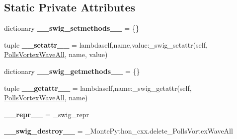 \subsection*{Static Private Attributes}
\begin{DoxyCompactItemize}
\item 
\hypertarget{classMontePython__cxx_1_1PollsVortexWaveAll_ad16d6df402fd173393577d4ea56b5842}{}dictionary {\bfseries \+\_\+\+\_\+swig\+\_\+setmethods\+\_\+\+\_\+} = \{\}\label{classMontePython__cxx_1_1PollsVortexWaveAll_ad16d6df402fd173393577d4ea56b5842}

\item 
\hypertarget{classMontePython__cxx_1_1PollsVortexWaveAll_ae5198d88ff56bd3fb30e0570d44aa002}{}tuple {\bfseries \+\_\+\+\_\+setattr\+\_\+\+\_\+} = lambdaself,name,value\+:\+\_\+swig\+\_\+setattr(self, \hyperlink{classMontePython__cxx_1_1PollsVortexWaveAll}{Polls\+Vortex\+Wave\+All}, name, value)\label{classMontePython__cxx_1_1PollsVortexWaveAll_ae5198d88ff56bd3fb30e0570d44aa002}

\item 
\hypertarget{classMontePython__cxx_1_1PollsVortexWaveAll_a1650e3e3764d597b9dd0f299d5fbc6c9}{}dictionary {\bfseries \+\_\+\+\_\+swig\+\_\+getmethods\+\_\+\+\_\+} = \{\}\label{classMontePython__cxx_1_1PollsVortexWaveAll_a1650e3e3764d597b9dd0f299d5fbc6c9}

\item 
\hypertarget{classMontePython__cxx_1_1PollsVortexWaveAll_a04a545796e9569b8cc2e822381d63322}{}tuple {\bfseries \+\_\+\+\_\+getattr\+\_\+\+\_\+} = lambdaself,name\+:\+\_\+swig\+\_\+getattr(self, \hyperlink{classMontePython__cxx_1_1PollsVortexWaveAll}{Polls\+Vortex\+Wave\+All}, name)\label{classMontePython__cxx_1_1PollsVortexWaveAll_a04a545796e9569b8cc2e822381d63322}

\item 
\hypertarget{classMontePython__cxx_1_1PollsVortexWaveAll_a829b48677d9d282d9b5883c5f1a8d08d}{}{\bfseries \+\_\+\+\_\+repr\+\_\+\+\_\+} = \+\_\+swig\+\_\+repr\label{classMontePython__cxx_1_1PollsVortexWaveAll_a829b48677d9d282d9b5883c5f1a8d08d}

\item 
\hypertarget{classMontePython__cxx_1_1PollsVortexWaveAll_a555411c118b500da6c9f5ad4d52045df}{}{\bfseries \+\_\+\+\_\+swig\+\_\+destroy\+\_\+\+\_\+} = \+\_\+\+Monte\+Python\+\_\+cxx.\+delete\+\_\+\+Polls\+Vortex\+Wave\+All\label{classMontePython__cxx_1_1PollsVortexWaveAll_a555411c118b500da6c9f5ad4d52045df}

\end{DoxyCompactItemize}


